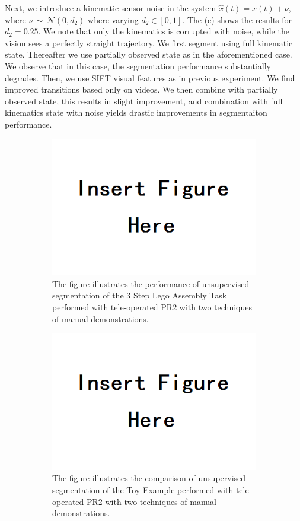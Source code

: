 Next, we introduce a kinematic sensor noise in the system $\hat{x}(t)= x(t)+\nu$, where $\nu\, \sim\, \mathcal{N}(0, d_2)$ where varying $d_2\in[0,1]$. The  (c) shows the results for $d_2=0.25$. We note that only the kinematics is corrupted with noise, while the vision sees a perfectly straight trajectory. We first segment using full kinematic state. Thereafter we use partially observed state as in the aforementioned case. We observe that in this case, the segmentation performance substantially degrades. Then, we use SIFT visual features as in previous experiment. We find improved transitions based only on videos. We then combine with partially observed state, this results in slight improvement, and combination with full kinematics state with noise yields drastic improvements in segmentaiton performance. 


\begin{figure}[ht!]
	\centering
	\begin{subfigure}[t]{3.4in}
	    \centering
        \includegraphics[width=0.5\linewidth]{figures/insert}
		\caption{The figure illustrates the performance of unsupervised segmentation of the 3 Step Lego Assembly Task performed with tele-operated PR2 with two techniques of manual demonstrations.}
		\vspace{-5pt}
	\end{subfigure}
	 \hspace{0.1in}
	\begin{subfigure}[t]{3.4in}
	    \centering
		\includegraphics[width=0.5\linewidth]{figures/insert}
		\caption{The figure illustrates the comparison of unsupervised segmentation of the Toy Example performed with tele-operated PR2 with two techniques of manual demonstrations.}
		\vspace{-5pt}
	\end{subfigure}
	\caption{}
	\vspace{-15pt}
\end{figure}


